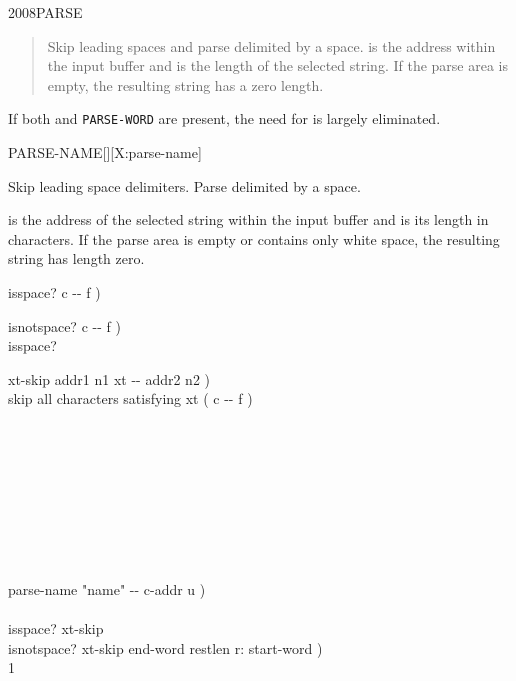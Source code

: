 \begin{worddef}{2008}{PARSE}
\begin{defer}
\begin{enumerate}
\begin{quote}
				Skip leading spaces and parse  delimited by
				a space.  is the address within the input
				buffer and  is the length of the selected string.
				If the parse area is empty, the resulting string has a
				zero length.
			\end{quote}

			If both  and \texttt{PARSE-WORD} are present,
			the need for  is largely eliminated.
		\end{enumerate}
	\end{defer}
\end{worddef}


\begin{worddef}{}{PARSE-NAME}[][X:parse-name]
\item {}

	Skip leading space delimiters. Parse  delimited by a
	space.

	 is the address of the selected string within the
	input buffer and  is its length in characters. If the
	parse area is empty or contains only white space, the resulting
	string has length zero.

	\begin{defer}
	\implementation
		\word{:} isspace?  c -{}- f ) \\
		\tab {}   \word{;}

		\word{:} isnotspace?  c -{}- f ) \\
		\tab isspace?  \word{;}

		\word{:} xt-skip  addr1 n1 xt -{}- addr2 n2 ) \\
		\tab {} skip all characters satisfying xt ( c -{}- f ) \\
		\tab {} \\
		\tab {} \\
		\tab[2]  \\
		\tab {} \\
		\tab[2]     \\
		\tab {} \\
		  \\
		\tab {}  \\
		\tab {}  \word{;}

		\word{:} parse-name  "name" -{}- c-addr u ) \\
		\tab {}    \\
		\tab \word{[']} isspace? xt-skip   \\
		\tab \word{[']} isnotspace? xt-skip  end-word restlen r: start-word ) \\
		\tab {} 1  \word{+}   \word{-}  \word{!} \\
		\tab {}   \word{-} \word{;}


\end{defer}
\end{worddef}
